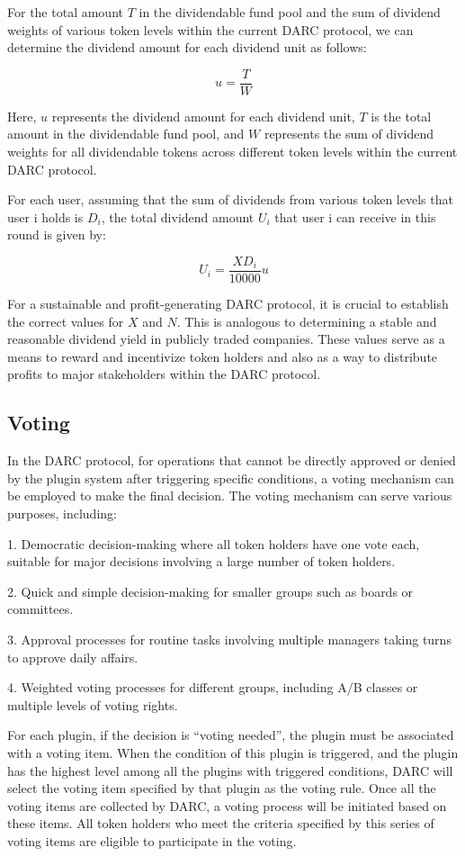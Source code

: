 \documentclass[main.tex]{subfiles}
\begin{document}
For the total amount $T$ in the dividendable fund pool and the sum of dividend weights of various token levels within the current DARC protocol, we can determine the dividend amount for each dividend unit as follows:

\[u = \frac{T}{W}\]

Here, $u$ represents the dividend amount for each dividend unit, $T$ is the total amount in the dividendable fund pool, and $W$ represents the sum of dividend weights for all dividendable tokens across different token levels within the current DARC protocol.

For each user, assuming that the sum of dividends from various token levels that user i holds is $D_i$, the total dividend amount $U_i$ that user i can receive in this round is given by:

\[ U_i = \frac{XD_i}{10000}u\]

For a sustainable and profit-generating DARC protocol, it is crucial to establish the correct values for $X$ and $N$. This is analogous to determining a stable and reasonable dividend yield in publicly traded companies. These values serve as a means to reward and incentivize token holders and also as a way to distribute profits to major stakeholders within the DARC protocol.

\subsection{Voting}

In the DARC protocol, for operations that cannot be directly approved or denied by the plugin system after triggering specific conditions, a voting mechanism can be employed to make the final decision. The voting mechanism can serve various purposes, including:

1. Democratic decision-making where all token holders have one vote each, suitable for major decisions involving a large number of token holders.

2. Quick and simple decision-making for smaller groups such as boards or committees.

3. Approval processes for routine tasks involving multiple managers taking turns to approve daily affairs.

4. Weighted voting processes for different groups, including A/B classes or multiple levels of voting rights.

For each plugin, if the decision is ``voting needed'', the plugin must be associated with a voting item. When the condition of this plugin is triggered, and the plugin has the highest level among all the plugins with triggered conditions, DARC will select the voting item specified by that plugin as the voting rule. Once all the voting items are collected by DARC, a voting process will be initiated based on these items. All token holders who meet the criteria specified by this series of voting items are eligible to participate in the voting.
\end{document}
